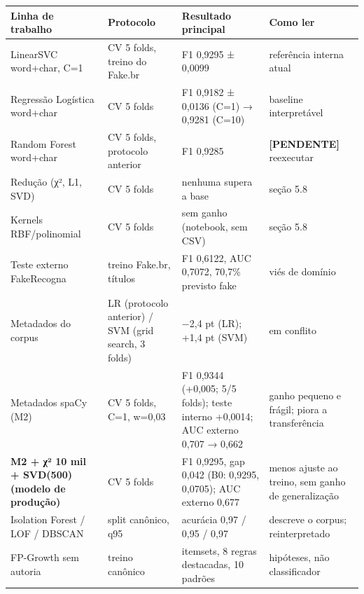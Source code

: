 \documentclass[
  brazilian,
  11pt,
]{article}
\newcounter{none} %
\begin{document}
{\def\LTcaptype{none} %
\begin{longtable}[]{@{}
  >{\raggedright\arraybackslash}p{}
  >{\raggedright\arraybackslash}p{}
  >{\raggedright\arraybackslash}p{}
  >{\raggedright\arraybackslash}p{}@{}}
\toprule\noalign{}
\begin{minipage}[b]{\linewidth}\raggedright
Linha de trabalho
\end{minipage} & \begin{minipage}[b]{\linewidth}\raggedright
Protocolo
\end{minipage} & \begin{minipage}[b]{\linewidth}\raggedright
Resultado principal
\end{minipage} & \begin{minipage}[b]{\linewidth}\raggedright
Como ler
\end{minipage} \\
\midrule\noalign{}
\endhead
\bottomrule\noalign{}
\endlastfoot
LinearSVC word+char, C=1 & CV 5 folds, treino do Fake.br & F1 0,9295 ± 0,0099 & referência interna atual \\
Regressão Logística word+char & CV 5 folds & F1 0,9182 ± 0,0136 (C=1) → 0,9281 (C=10) & baseline interpretável \\
Random Forest word+char & CV 5 folds, protocolo anterior & F1 0,9285 & \textbf{{[}PENDENTE{]}} reexecutar \\
Redução (χ², L1, SVD) & CV 5 folds & nenhuma supera a base & seção 5.8 \\
Kernels RBF/polinomial & CV 5 folds & sem ganho (notebook, sem CSV) & seção 5.8 \\
Teste externo FakeRecogna & treino Fake.br, títulos & F1 0,6122, AUC 0,7072, 70,7\% previsto fake & viés de domínio \\
Metadados do corpus & LR (protocolo anterior) / SVM (grid search, 3 folds) & −2,4 pt (LR); +1,4 pt (SVM) & em conflito \\
Metadados spaCy (M2) & CV 5 folds, C=1, w=0,03 & F1 0,9344 (+0,005; 5/5 folds); teste interno +0,0014; AUC externo 0,707 → 0,662 & ganho pequeno e frágil; piora a transferência \\
\textbf{M2 + χ² 10 mil + SVD(500) (modelo de produção)} & CV 5 folds & F1 0,9295, gap 0,042 (B0: 0,9295, 0,0705); AUC externo 0,677 & menos ajuste ao treino, sem ganho de generalização \\
Isolation Forest / LOF / DBSCAN & split canônico, q95 & acurácia 0,97 / 0,95 / 0,97 & descreve o corpus; reinterpretado \\
FP-Growth sem autoria & treino canônico & 18 itemsets, 8 regras destacadas, 10 padrões & hipóteses, não classificador \\
\end{longtable}
}
\end{document}
